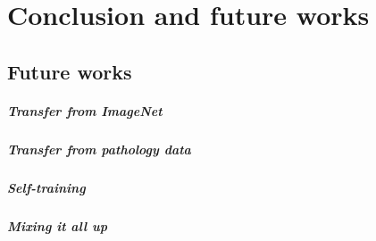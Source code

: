 \chapter{Conclusion and future works}
\label{chap:conclusions}

\section{Future works}

\paragraph{Transfer from ImageNet} 


\paragraph{Transfer from pathology data}


\paragraph{Self-training}


\paragraph{Mixing it all up}

